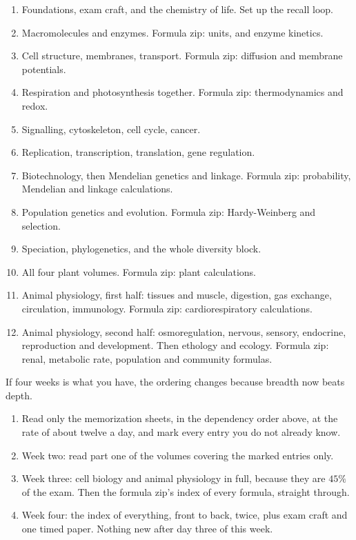 \begin{keybox}[title={The twelve week plan}]
\begin{enumerate}
\item Foundations, exam craft, and the chemistry of life. Set up the recall loop.
\item Macromolecules and enzymes. Formula zip: units, and enzyme kinetics.
\item Cell structure, membranes, transport. Formula zip: diffusion and membrane
      potentials.
\item Respiration and photosynthesis together. Formula zip: thermodynamics and redox.
\item Signalling, cytoskeleton, cell cycle, cancer.
\item Replication, transcription, translation, gene regulation.
\item Biotechnology, then Mendelian genetics and linkage. Formula zip: probability,
      Mendelian and linkage calculations.
\item Population genetics and evolution. Formula zip: Hardy-Weinberg and selection.
\item Speciation, phylogenetics, and the whole diversity block.
\item All four plant volumes. Formula zip: plant calculations.
\item Animal physiology, first half: tissues and muscle, digestion, gas exchange,
      circulation, immunology. Formula zip: cardiorespiratory calculations.
\item Animal physiology, second half: osmoregulation, nervous, sensory, endocrine,
      reproduction and development. Then ethology and ecology. Formula zip: renal,
      metabolic rate, population and community formulas.
\end{enumerate}
\end{keybox}

\begin{tipbox}[title={The four week compression}]
If four weeks is what you have, the ordering changes because breadth now beats depth.
\begin{enumerate}
\item Read only the memorization sheets, in the dependency order above, at the rate of
      about twelve a day, and mark every entry you do not already know.
\item Week two: read part one of the volumes covering the marked entries only.
\item Week three: cell biology and animal physiology in full, because they are $45\%$
      of the exam. Then the formula zip's index of every formula, straight through.
\item Week four: the index of everything, front to back, twice, plus exam craft and one
      timed paper. Nothing new after day three of this week.
\end{enumerate}
\end{tipbox}

